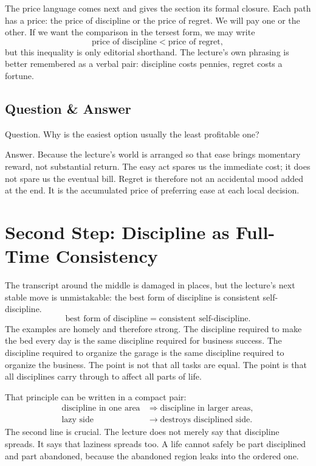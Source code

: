 The price language comes next and gives the section its formal closure. Each path has a price: the price of discipline or the price of regret. We will pay one or the other. If we want the comparison in the tersest form, we may write
\begin{equation}
\text{price of discipline} < \text{price of regret},
\end{equation}
but this inequality is only editorial shorthand. The lecture's own phrasing is better remembered as a verbal pair: discipline costs pennies, regret costs a fortune.

\subsection{Question \& Answer}

Question. Why is the easiest option usually the least profitable one?

Answer. Because the lecture's world is arranged so that ease brings momentary reward, not substantial return. The easy act spares us the immediate cost; it does not spare us the eventual bill. Regret is therefore not an accidental mood added at the end. It is the accumulated price of preferring ease at each local decision.

\section{Second Step: Discipline as Full-Time Consistency}

The transcript around the middle is damaged in places, but the lecture's next stable move is unmistakable: the best form of discipline is consistent self-discipline.
\begin{equation}
\text{best form of discipline} = \text{consistent self-discipline}.
\end{equation}
The examples are homely and therefore strong. The discipline required to make the bed every day is the same discipline required for business success. The discipline required to organize the garage is the same discipline required to organize the business. The point is not that all tasks are equal. The point is that all disciplines carry through to affect all parts of life.

That principle can be written in a compact pair:
\begin{align}
\text{discipline in one area} &\Rightarrow \text{discipline in larger areas}, \\
\text{lazy side} &\to \text{destroys disciplined side}.
\end{align}
The second line is crucial. The lecture does not merely say that discipline spreads. It says that laziness spreads too. A life cannot safely be part disciplined and part abandoned, because the abandoned region leaks into the ordered one.

